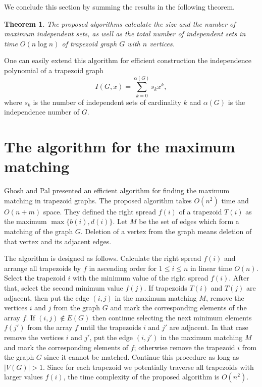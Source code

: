 \documentclass[11pt,letter]{article}
\newtheorem{thm}{Theorem}[section]
\begin{document}
We conclude this section by summing the results in the following theorem.

\begin{thm}
The proposed algorithms calculate the size and the number of maximum independent sets, as well as
the total number of independent sets in time $O (n \log n)$ of trapezoid graph $G$ with $n$
vertices.
\end{thm}

One can easily extend this algorithm for efficient construction the independence polynomial of a
trapezoid graph
$$
I (G, x) = \sum_{k = 0}^{\alpha (G)} s_k x^k,
$$
where $s_k$ is the number of independent sets of cardinality $k$ and $\alpha(G)$ is the
independence number of $G$.


\section{The algorithm for the maximum matching}

Ghosh and Pal \cite{GhPa05} presented an efficient algorithm for finding the maximum matching in
trapezoid graphs. The proposed algorithm takes $O(n^2)$ time and $O(n + m)$ space. They defined the
right spread $f(i)$ of a trapezoid $T (i)$ as the maximum $\max \{b (i), d (i)\}$. Let $M$ be the
set of edges which form a matching of the graph $G$. Deletion of a vertex from the graph means
deletion of that vertex and its adjacent edges.

The algorithm is designed as follows. Calculate the right spread $f (i)$ and arrange all trapezoids
by $f$ in ascending order for $1 \leq i \leq n$ in linear time $O (n)$. Select the trapezoid $i$
with the minimum value of the right spread $f (i)$. After that, select the second minimum value $f
(j)$. If trapezoids $T (i)$ and $T (j)$ are adjacent, then put the edge $(i, j)$ in the maximum
matching $M$, remove the vertices $i$ and $j$ from the graph $G$ and mark the corresponding
elements of the array $f$. If $(i, j) \not \in E (G)$ then continue selecting the next minimum
elements $f (j')$ from the array $f$ until the trapezoids $i$ and $j'$ are adjacent. In that case
remove the vertices $i$ and $j'$, put the edge $(i, j')$ in the maximum matching $M$ and mark the
corresponding elements of $f$; otherwise remove the trapezoid $i$ from the graph $G$ since it
cannot be matched. Continue this procedure as long as $|V (G)| > 1$. Since for each trapezoid we
potentially traverse all trapezoids with larger values $f (i)$, the time complexity of the proposed
algorithm is $O (n^2)$.
\end{document}
